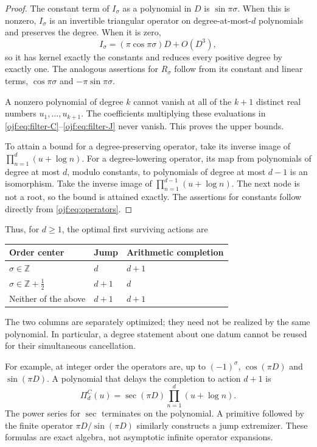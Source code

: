\documentclass[11pt,a4paper]{article}
\numberwithin{equation}{section}
\theoremstyle{definition}\newtheorem{definition}[theorem]{Definition}
\theoremstyle{remark}\newtheorem{remark}[theorem]{Remark}
\begin{document}
\begin{proof}
The constant term of $I_\sigma$ as a polynomial in $D$ is
$\sin\pi\sigma$. When this is nonzero, $I_\sigma$ is an invertible
triangular operator on degree-at-most-$d$ polynomials and preserves the
degree. When it is zero,
\[
 I_\sigma=(\pi\cos\pi\sigma)D+O(D^3),
\]
so it has kernel exactly the constants and reduces every positive degree
by exactly one. The analogous assertions for $R_\sigma$ follow from
its constant and linear terms, $\cos\pi\sigma$ and
$-\pi\sin\pi\sigma$.

A nonzero polynomial of degree $k$ cannot vanish at all of the $k+1$
distinct real numbers $u_1,\ldots,u_{k+1}$. The coefficients multiplying
these evaluations in \eqref{ojf:eq:filter-C}--\eqref{ojf:eq:filter-J}
never vanish. This proves the upper bounds.

To attain a bound for a degree-preserving operator, take its inverse
image of $\prod_{n=1}^d(u+\log n)$. For a degree-lowering operator,
its map from polynomials of degree at most $d$, modulo constants, to
polynomials of degree at most $d-1$ is an isomorphism. Take the inverse
image of $\prod_{n=1}^{d-1}(u+\log n)$. The next node is not a root,
so the bound is attained exactly. The assertions for constants follow
directly from \eqref{ojf:eq:operators}.
\end{proof}

Thus, for $d\ge1$, the optimal first surviving actions are
\begin{center}
\begin{tabular}{@{}lll@{}}\toprule
Order center & Jump & Arithmetic completion\\\midrule
$\sigma\in\mathbb Z$ & $d$ & $d+1$\\
$\sigma\in\mathbb Z+\tfrac12$ & $d+1$ & $d$\\
Neither of the above & $d+1$ & $d+1$\\\bottomrule
\end{tabular}
\end{center}
The two columns are separately optimized; they need not be realized by
the same polynomial. In particular, a degree statement about one datum
cannot be reused for their simultaneous cancellation.

For example, at integer order the operators are, up to $(-1)^\sigma$,
$\cos(\pi D)$ and $\sin(\pi D)$. A polynomial that delays the completion
to action $d+1$ is
\begin{equation}\label{ojf:eq:cos-extremizer}
 \Pi^{C}_d(u)=\sec(\pi D)\prod_{n=1}^d(u+\log n).
\end{equation}
The power series for $\sec$ terminates on the polynomial. A primitive
followed by the finite operator $\pi D/\sin(\pi D)$ similarly constructs
a jump extremizer. These formulas are exact algebra, not asymptotic
infinite operator expansions.
\end{document}
